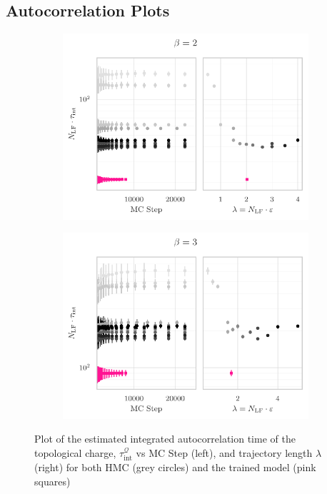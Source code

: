 \documentclass{article} %
\begin{document}
\subsection{\label{subsec:autocorr_plots}Autocorrelation Plots}
%
\begin{figure}[htpb]
   \centering
   \begin{subfigure}{0.45\textwidth}
      \includegraphics[width=\textwidth]{figures/autocorr_plots_2021_03_09/autocorr_vs_traj_len_2153_b2.pdf}
   \end{subfigure}
   \hfill
   \begin{subfigure}{0.45\textwidth}
      \includegraphics[width=\textwidth]{figures/autocorr_plots_2021_03_09/autocorr_vs_traj_len_2151_b3.pdf}
   \end{subfigure}
   \caption{\label{fig:autocorrbeta2}Plot of the estimated integrated autocorrelation time of the topological charge,
      \(\tau_{\mathrm{int}}^{\mathcal{Q}}\) vs MC Step (left), and trajectory length \(\lambda\) (right) for both HMC
   (grey circles) and the trained model (pink squares)}
\end{figure}
\end{document}
